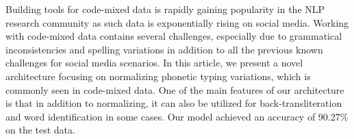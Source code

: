 Building tools for code-mixed data is rapidly gaining popularity in the NLP research community as such data is exponentially rising on social media. Working with code-mixed data contains several challenges, especially due to grammatical inconsistencies and spelling variations in addition to all the previous known challenges for social media scenarios. In this article, we present a novel architecture focusing on normalizing phonetic typing variations, which is commonly seen in code-mixed data. One of the main features of our architecture is that in addition to normalizing, it can also be utilized for back-transliteration and word identification in some cases. Our model achieved an accuracy of 90.27\% on the test data.

